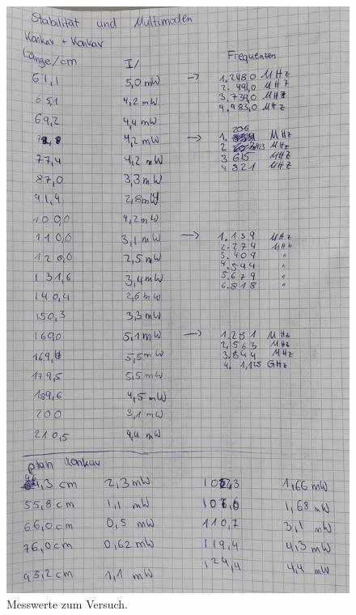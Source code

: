 \begin{figure}[h]
    \centering
     \includegraphics[scale=0.3]{Abbildungen/Kladde3.jpg}
    \caption{Messwerte zum Versuch.}
\end{figure}
